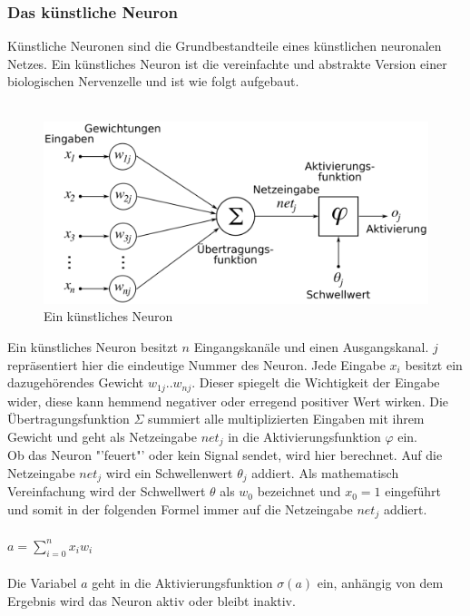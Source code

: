 \documentclass[12pt,oneside,a4paper,parskip]{scrbook}
\begin{document}
\subsubsection{Das künstliche Neuron}
Künstliche Neuronen sind die Grundbestandteile eines künstlichen neuronalen Netzes.
Ein künstliches Neuron ist die vereinfachte und abstrakte Version einer biologischen Nervenzelle und ist wie folgt aufgebaut.\\\\
\begin{figure}[h]
	\begin{center}
		\includegraphics[width=12cm]{Bilder/ArtificialNeuronModel_deutsch.png}
		\caption{Ein künstliches Neuron}
		\label{fig:wikiNeuron}
	\end{center}
\end{figure}
Ein künstliches Neuron besitzt $n$ Eingangskanäle und einen Ausgangskanal. $j$ repräsentiert hier die eindeutige Nummer des Neuron. Jede Eingabe $x_{i}$ besitzt ein dazugehörendes Gewicht $w_{1j}..w_{nj}$. Dieser spiegelt die Wichtigkeit der Eingabe wider, diese kann hemmend negativer oder erregend positiver Wert wirken. Die Übertragungsfunktion $\Sigma$ summiert alle multiplizierten Eingaben mit ihrem Gewicht und geht als Netzeingabe $net_j$ in die Aktivierungsfunktion $\varphi$ ein. \\
Ob das Neuron "'feuert"' oder kein Signal sendet, wird hier berechnet. Auf die Netzeingabe $net_j$ wird ein Schwellenwert $\theta_j$ addiert. Als mathematisch Vereinfachung wird der Schwellwert $\theta$ als $w_0$ bezeichnet und $x_0 = 1$ eingeführt und somit in der folgenden Formel immer auf die Netzeingabe $net_j$ addiert.
\\\\
${\displaystyle a=\sum _{i=0}^{n}x_{i}w_{i}}$
\\\\
Die Variabel $a$ geht in die Aktivierungsfunktion ${\sigma (a)}$ ein, anhängig von dem Ergebnis wird das Neuron aktiv oder bleibt inaktiv.
\end{document}
